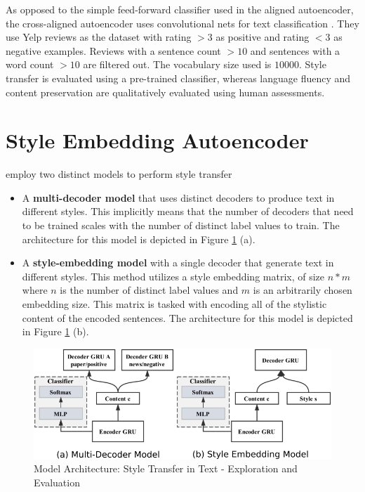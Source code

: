 As opposed to the simple feed-forward classifier used in the aligned autoencoder, the cross-aligned autoencoder uses convolutional nets for text classification \citep{kim2014convolutional}. They use Yelp reviews as the dataset with rating $>3$ as positive and rating $<3$ as negative examples. Reviews with a sentence count $>10$ and sentences with a word count $>10$ are filtered out. The vocabulary size used is $10000$. Style transfer is evaluated using a pre-trained classifier, whereas language fluency and content preservation are qualitatively evaluated using human assessments.

\section{Style Embedding Autoencoder}

\cite{fu2017style} employ two distinct models to perform style transfer
\begin{itemize}
	\item A \textbf{multi-decoder model} that uses distinct decoders to produce text in different styles. This implicitly means that the number of decoders that need to be trained scales with the number of distinct label values to train. The architecture for this model is depicted in Figure \ref{fig:semb-architecture} (a).
	\item A \textbf{style-embedding model} with a single decoder that generate text in different styles. This method utilizes a style embedding matrix, of size $n * m$ where $n$ is the number of distinct label values and $m$ is an arbitrarily chosen embedding size. This matrix is tasked with encoding all of the stylistic content of the encoded sentences. The architecture for this model is depicted in Figure \ref{fig:semb-architecture} (b).
\end{itemize}

\begin{figure}[ht]
	\centering
	\includegraphics[width=\textwidth]{images/semb-architecture}
	\caption{\label{fig:semb-architecture} Model Architecture: Style Transfer in Text - Exploration and Evaluation}
\end{figure}

